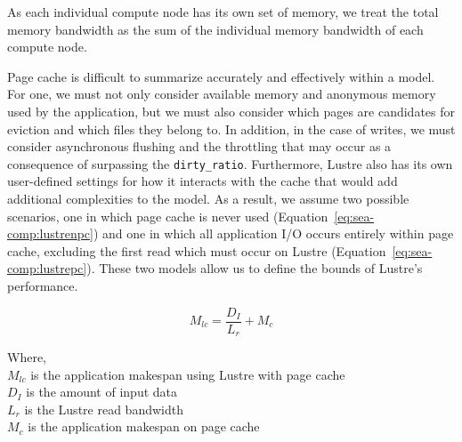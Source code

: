 \documentclass[10pt,journal,compsoc]{IEEEtran}
\begin{document}
       As each individual compute node has its own set of memory, we treat the
      total memory bandwidth as the sum of the individual memory bandwidth of
      each compute node.


      Page cache is difficult to summarize accurately and effectively within a
      model. For one, we must not only consider available memory and anonymous
      memory used by the application, but we must also consider which pages are
      candidates for eviction and which files they belong to. In addition, in
      the case of writes, we must consider asynchronous flushing and the
      throttling that may occur as a consequence of surpassing the
      \texttt{dirty\_ratio}. Furthermore, Lustre also has its own user-defined
      settings for how it interacts with the cache that would add additional
      complexities to the model. As a result, we assume two possible scenarios,
      one in which page cache is never used
      (Equation~\ref{eq:sea-comp:lustrenpc}) and one in which all application
      I/O occurs entirely within page cache, excluding the first read which must
      occur on Lustre (Equation~\ref{eq:sea-comp:lustrepc}). These two models
      allow us to define the bounds of Lustre's performance.

      \begin{equation}\label{eq:sea-comp:lustrepc}
          M_{lc} = \frac{D_{I}}{L_{r}} + M_{c}
      \end{equation}

      {\noindent}
      Where, \\
      $M_{lc}$ is the application makespan using Lustre with page cache \\
      $D_{I}$ is the amount of input data \\
      $L_{r}$ is the Lustre read bandwidth \\
      $M_{c}$ is the application makespan on page cache \\


\end{document}
